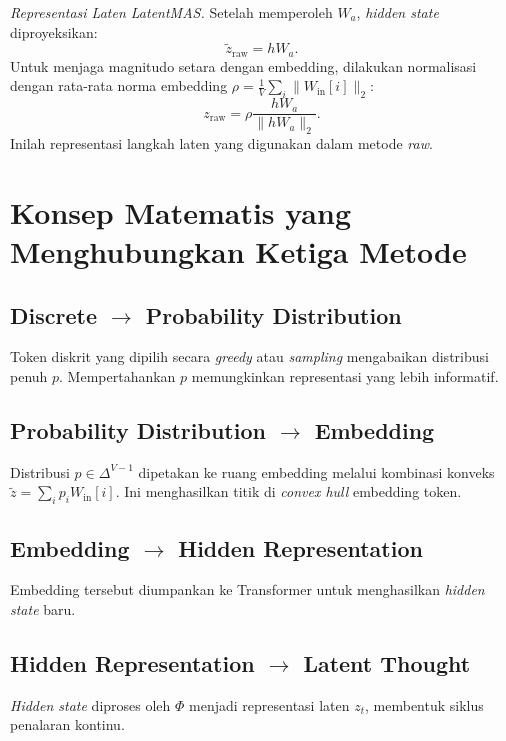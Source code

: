 \textit{Representasi Laten LatentMAS.} Setelah memperoleh \(W_a\), \textit{hidden state} diproyeksikan:
\begin{equation}
\tilde z_{\mathrm{raw}} = h W_a.
\end{equation}
Untuk menjaga magnitudo setara dengan embedding, dilakukan normalisasi dengan rata-rata norma embedding \(\rho = \frac{1}{V}\sum_i \|W_{\mathrm{in}}[i]\|_2\):
\begin{equation}
\boxed{ z_{\mathrm{raw}} = \rho \frac{h W_a}{\|h W_a\|_2} }.
\tag{2.6}
\end{equation}
Inilah representasi langkah laten yang digunakan dalam metode \textit{raw}.

\section{Konsep Matematis yang Menghubungkan Ketiga Metode}

\subsection{Discrete $\rightarrow$ Probability Distribution}
Token diskrit yang dipilih secara \textit{greedy} atau \textit{sampling} mengabaikan distribusi penuh \(p\). Mempertahankan \(p\) memungkinkan representasi yang lebih informatif.

\subsection{Probability Distribution $\rightarrow$ Embedding}
Distribusi \(p \in \Delta^{V-1}\) dipetakan ke ruang embedding melalui kombinasi konveks \(\tilde z = \sum_i p_i W_{\mathrm{in}}[i]\). Ini menghasilkan titik di \textit{convex hull} embedding token.

\subsection{Embedding $\rightarrow$ Hidden Representation}
Embedding tersebut diumpankan ke Transformer untuk menghasilkan \textit{hidden state} baru.

\subsection{Hidden Representation $\rightarrow$ Latent Thought}
\textit{Hidden state} diproses oleh \(\Phi\) menjadi representasi laten \(z_t\), membentuk siklus penalaran kontinu.

